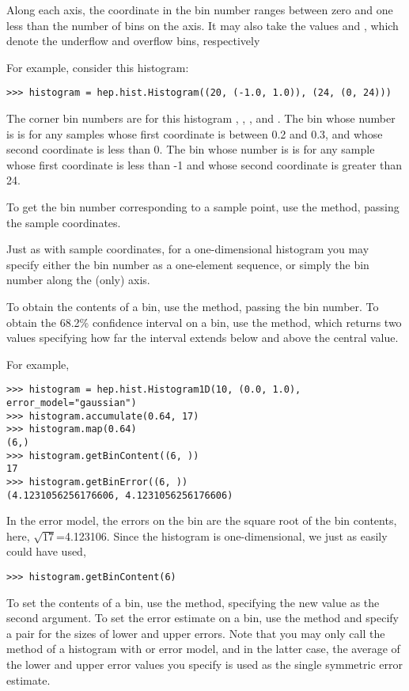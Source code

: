Along each axis, the coordinate in the bin number ranges between zero
and one less than the number of bins on the axis.  It may also take the
values  and , which denote the
underflow and overflow bins, respectively

For example, consider this histogram:
\begin{verbatim}
>>> histogram = hep.hist.Histogram((20, (-1.0, 1.0)), (24, (0, 24)))
\end{verbatim}
The corner bin numbers are for this histogram ,
, , and .  
The bin whose number is  is for any samples
whose first coordinate is between 0.2 and 0.3, and whose second
coordinate is less than 0.  The bin whose number is
 is for any sample whose first
coordinate is less than -1 and whose second coordinate is greater than
24.

To get the bin number corresponding to a sample point, use the
 method, passing the sample coordinates. 

Just as with sample coordinates, for a one-dimensional histogram you may
specify either the bin number as a one-element sequence, or simply the
bin number along the (only) axis.

To obtain the contents of a bin, use the  method,
passing the bin number.  To obtain the 68.2\% confidence interval on a
bin, use the  method, which returns two values
specifying how far the interval extends below and above the central
value.

For example,
\begin{verbatim}
>>> histogram = hep.hist.Histogram1D(10, (0.0, 1.0), error_model="gaussian")
>>> histogram.accumulate(0.64, 17)
>>> histogram.map(0.64)
(6,)
>>> histogram.getBinContent((6, ))
17
>>> histogram.getBinError((6, ))
(4.1231056256176606, 4.1231056256176606)
\end{verbatim}
In the  error model, the errors on the bin are the
square root of the bin contents, here, $\sqrt{17}$=4.123106.  Since the
histogram is one-dimensional, we just as easily could have used,
\begin{verbatim}
>>> histogram.getBinContent(6)
\end{verbatim}

To set the contents of a bin, use the  method,
specifying the new value as the second argument.  To set the error
estimate on a bin, use the  method and specify a
pair for the sizes of lower and upper errors.  Note that you may only
call the  method of a histogram with
 or  error model, and in the latter
case, the average of the lower and upper error values you specify is
used as the single symmetric error estimate.

